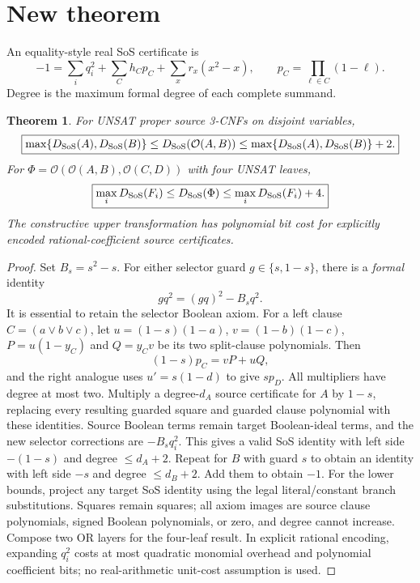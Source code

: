\documentclass[11pt]{article}
\newtheorem{theorem}{Theorem}
\begin{document}
\section{New theorem}
An equality-style real SoS certificate is
\[
-1=\sum_i q_i^2+\sum_C h_Cp_C+\sum_x r_x(x^2-x),
\qquad p_C=\prod_{\ell\in C}(1-\ell).
\]
Degree is the maximum formal degree of each complete summand.
\begin{theorem}
For UNSAT proper source 3-CNFs on disjoint variables,
\[
\boxed{\max\{D_{\rm SoS}(A),D_{\rm SoS}(B)\}
\le D_{\rm SoS}(\mathcal O(A,B))
\le \max\{D_{\rm SoS}(A),D_{\rm SoS}(B)\}+2.}
\]
For $\Phi=\mathcal O(\mathcal O(A,B),\mathcal O(C,D))$ with four UNSAT leaves,
\[
\boxed{\max_iD_{\rm SoS}(F_i)\le D_{\rm SoS}(\Phi)\le\max_iD_{\rm SoS}(F_i)+4.}
\]
The constructive upper transformation has polynomial bit cost for explicitly encoded rational-coefficient source certificates.
\end{theorem}
\begin{proof}
Set $B_s=s^2-s$. For either selector guard $g\in\{s,1-s\}$, there is a \emph{formal} identity
\[
\boxed{gq^2=(gq)^2-B_sq^2}.
\]
It is essential to retain the selector Boolean axiom. For a left clause $C=(a\vee b\vee c)$, let $u=(1-s)(1-a)$, $v=(1-b)(1-c)$, $P=u(1-y_C)$ and $Q=y_Cv$ be its two split-clause polynomials. Then
\[
\boxed{(1-s)p_C=vP+uQ},
\]
and the right analogue uses $u'=s(1-d)$ to give $sp_D$. All multipliers have degree at most two. Multiply a degree-$d_A$ source certificate for $A$ by $1-s$, replacing every resulting guarded square and guarded clause polynomial with these identities. Source Boolean terms remain target Boolean-ideal terms, and the new selector corrections are $-B_sq_i^2$. This gives a valid SoS identity with left side $-(1-s)$ and degree $\le d_A+2$. Repeat for $B$ with guard $s$ to obtain an identity with left side $-s$ and degree $\le d_B+2$. Add them to obtain $-1$. For the lower bounds, project any target SoS identity using the legal literal/constant branch substitutions. Squares remain squares; all axiom images are source clause polynomials, signed Boolean polynomials, or zero, and degree cannot increase. Compose two OR layers for the four-leaf result. In explicit rational encoding, expanding $q_i^2$ costs at most quadratic monomial overhead and polynomial coefficient bits; no real-arithmetic unit-cost assumption is used.
\end{proof}
\end{document}

